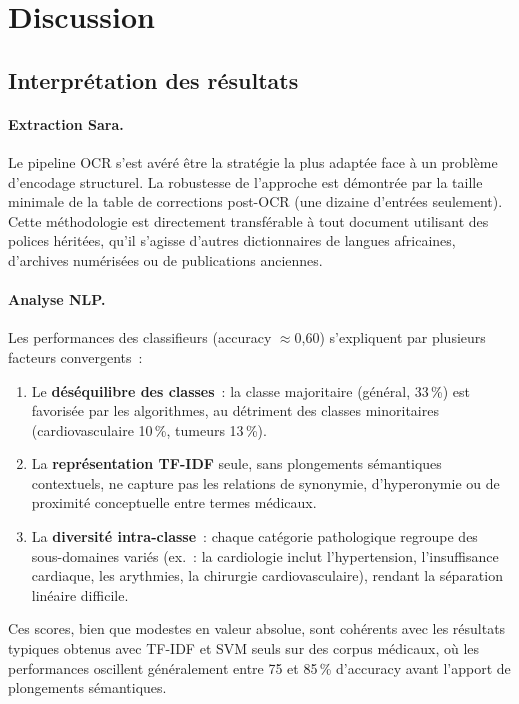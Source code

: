 \documentclass[11pt, a4paper, oneside]{article}
\begin{document}
\section{Discussion}

\subsection{Interprétation des résultats}

\paragraph{Extraction Sara.} Le pipeline OCR s'est avéré être la stratégie la plus adaptée face à un problème d'encodage structurel. La robustesse de l'approche est démontrée par la taille minimale de la table de corrections post-OCR (une dizaine d'entrées seulement). Cette méthodologie est directement transférable à tout document utilisant des polices héritées, qu'il s'agisse d'autres dictionnaires de langues africaines, d'archives numérisées ou de publications anciennes.

\paragraph{Analyse NLP.} Les performances des classifieurs (accuracy $\approx$0,60) s'expliquent par plusieurs facteurs convergents~:
\begin{enumerate}[noitemsep]
  \item Le \textbf{déséquilibre des classes}~: la classe majoritaire (général, 33\,\%) est favorisée par les algorithmes, au détriment des classes minoritaires (cardiovasculaire 10\,\%, tumeurs 13\,\%).
  \item La \textbf{représentation TF-IDF} seule, sans plongements sémantiques contextuels, ne capture pas les relations de synonymie, d'hyperonymie ou de proximité conceptuelle entre termes médicaux.
  \item La \textbf{diversité intra-classe}~: chaque catégorie pathologique regroupe des sous-domaines variés (ex.~: la cardiologie inclut l'hypertension, l'insuffisance cardiaque, les arythmies, la chirurgie cardiovasculaire), rendant la séparation linéaire difficile.
\end{enumerate}
Ces scores, bien que modestes en valeur absolue, sont cohérents avec les résultats typiques obtenus avec TF-IDF et SVM seuls sur des corpus médicaux, où les performances oscillent généralement entre 75 et 85\,\% d'accuracy avant l'apport de plongements sémantiques.
\end{document}
